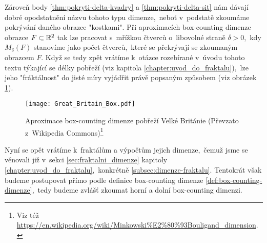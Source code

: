 Zároveň body \ref{thm:pokryti-delta-kvadry} a \ref{thm:pokryti-delta-sit} nám dávají dobré opodstatnění názvu tohoto typu dimenze,~neboť v~podstatě zkoumáme pokrývání daného obrazce "kostkami". Při aproximacích box-counting dimenze obrazce $F\subset\mathbb{R}^2$ tak lze pracovat s~mřížkou čtverců o~libovolné straně $\delta>0$,~kdy $M_\delta(F)$ stanovíme jako počet čtverců,~které se překrývají se zkoumaným obrazcem $F$. Když se tedy zpět vrátíme k~otázce rozebírané v~úvodu tohoto textu týkající se délky pobřeží (viz kapitola \ref{chapter:uvod_do_fraktalu}),~lze jeho "fráktálnost" do jisté míry vyjádřit právě popsaným způsobem (viz obrázek \ref{fig:aproximace-delky-pobrezi-vb}).
\begin{figure}
    \centering
    \texttt{[image: Great\_Britain\_Box.pdf]}
    \caption[Aproximace box-counting dimenze pobřeží Velké Británie]{Aproximace box-counting dimenze pobřeží Velké Británie (Převzato z~Wikipedia Commons)\footnote{Viz též \url{https://en.wikipedia.org/wiki/Minkowski\%E2\%80\%93Bouligand\_dimension}.}}
    \label{fig:aproximace-delky-pobrezi-vb}
\end{figure}
Nyní se opět vrátíme k~fraktálům a výpočtům jejich dimenze,~čemuž jsme se věnovali již v~sekci \ref{sec:fraktalni_dimenze} kapitoly \ref{chapter:uvod_do_fraktalu},~konkrétně \ref{subsec:dimenze-fraktalu}. Tentokrát však budeme postupovat přímo podle definice box-counting dimenze \ref{def:box-counting-dimenze},~tedy budeme zvlášť zkoumat horní a dolní box-counting dimenzi.
